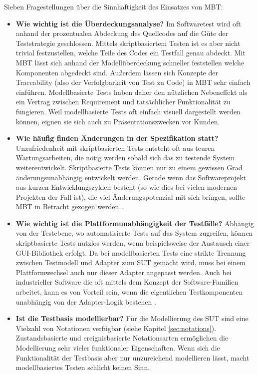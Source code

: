 Sieben Fragestellungen über die Sinnhaftigkeit des Einsatzes von \Gls{MBT}:

\begin{itemize}
\item \textbf{Wie wichtig ist die Überdeckungsanalyse?}
Im Softwaretest wird oft anhand der prozentualen Abdeckung des Quellcodes auf die Güte der Teststrategie geschlossen. Mittels skriptbasiertem Testen ist es aber nicht trivial festzustellen, welche Teile des Codes ein Testfall genau abdeckt. Mit \Gls{MBT} lässt sich anhand der Modellüberdeckung schneller feststellen welche Komponenten abgedeckt sind. Außerdem lassen sich Konzepte der Traceability (also der Verfolgbarkeit von Test zu Code) in \Gls{MBT} sehr einfach einführen. Modellbasierte Tests haben daher den nützlichen Nebeneffekt als ein Vertrag zwischen Requirement und tatsächlicher Funktionalität zu fungieren. Weil modellbasierte Tests oft einfach visuell dargestellt werden können, eignen sie sich auch zu Präsentationszwecken vor Kunden.
\item \textbf{Wie häufig finden Änderungen in der Spezifikation statt?} 
Unzufriedenheit mit skriptbasierten Tests entsteht oft aus teuren Wartungsarbeiten, die nötig werden sobald sich das zu testende System weiterentwickelt. Skriptbasierte Tests können nur zu einem gewissen Grad änderungsunabhängig entwickelt werden. Gerade wenn das Softwareprojekt aus kurzen Entwicklungszyklen besteht (so wie dies bei vielen modernen Projekten der Fall ist), die viel Änderungspotenzial mit sich bringen, sollte \Gls{MBT} in Betracht gezogen werden \cite{utting_practical_2007}.
\item \textbf{Wie wichtig ist die Plattformunabhängigkeit der Testfälle?}
Abhängig von der Testebene, wo automatisierte Tests auf das System zugreifen, können skriptbasierte Tests nutzlos werden, wenn beispielsweise der Austausch einer GUI-Bibliothek erfolgt. Da bei modellbasierten Tests eine strikte Trennung zwischen Testmodell und Adapter zum \Gls{SUT} gemacht wird, muss bei einem Plattformwechsel auch nur dieser Adapter angepasst werden. Auch bei industrieller Software die oft mittels dem Konzept der Software-Familien arbeitet, kann es von Vorteil sein, wenn die eigentlichen Testkomponenten unabhängig von der Adapter-Logik bestehen \cite{graham_experiences_2012}.
\item \textbf{Ist die Testbasis modellierbar?}
Für die Modellierung des \Gls{SUT} sind eine Vielzahl von Notationen verfügbar (siehe Kapitel \ref{sec:notations}). Zustandsbasierte und ereignisbasierte Notationsarten ermöglichen die Modellierung sehr vieler funktionaler Eigenschaften. Wenn sich die Funktionalität der Testbasis aber nur unzureichend modellieren lässt, macht modellbasiertes Testen schlicht keinen Sinn.

\end{itemize}
